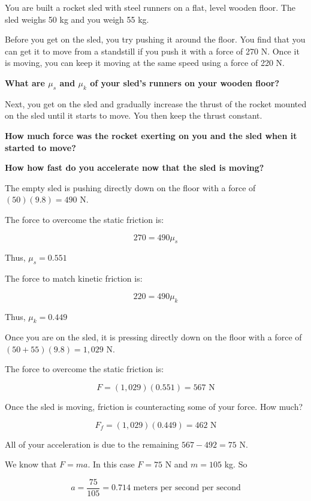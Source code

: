 \begin{Exercise}[title={Rocket Sled},  label=rocketsled1]
  
You are built a rocket sled with steel runners on a flat, level wooden floor. The sled weighs 50 kg and you weigh 55 kg.

Before you get on the sled,   you try pushing it around the floor. You find that you can get it to move from a
standstill if you push it with a force of 270 N.   Once it is moving,  you can keep it moving at the same speed using a force of 220 N.

\textbf{What are $\mu_s$ and $\mu_k$  of your sled's runners on your wooden floor?}

Next, you get on the sled and gradually increase the thrust of the rocket mounted on the sled until it starts to move. You then keep the thrust constant.

\textbf{How much force was the rocket exerting on you and the sled when it started to move?}

\textbf{How how fast do you accelerate now that the sled is moving?}

\end{Exercise}
\begin{Answer}[ref=rocketsled1]

The empty sled is pushing directly down on the floor with a force of $(50)(9.8) = 490$ N.

The force to overcome the static friction is:

$$270 = 490 \mu_s$$

Thus, $\mu_s = 0.551$

The force to match kinetic friction is:

$$220 = 490 \mu_k$$

Thus, $\mu_k = 0.449$

Once you are on the sled, it is pressing directly down on the floor with a force of $(50  + 55)(9.8) = 1,029$ N.

The force to overcome the static friction is:

$$F = (1,029)(0.551) = 567 \text{ N}$$

Once the sled is moving, friction is counteracting some of your force. How much?

$$F_f = (1,029)(0.449) = 462 \text{ N}$$

All of your acceleration is due to the remaining $567 - 492 = 75$ N.

We know that $F = ma$. In this case $F = 75$ N and $m = 105$ kg. So

$$a = \frac{75}{105} = 0.714 \text{ meters per second per second}$$

\end{Answer}

